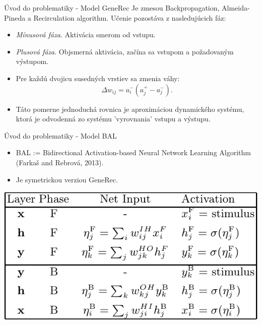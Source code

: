 \documentclass[xcolor=dvipsnames]{beamer}
\begin{document}
\begin{frame}{Úvod do problematiky - Model GeneRec}
Je zmesou Backpropagation, Almeida-Pineda a Recirculation algorithm. Učenie pozostáva z nasledujúcich fáz: 
  \begin{itemize}
    \item \emph{Mínusová fáza}. Aktivácia smerom od vstupu. 
    \item \emph{Plusová fáza}. Objsmerná aktivácia, začína sa vstupom a požadovaným výstupom. 
    \item Pre každú dvojicu susedných vrstiev sa zmenia váhy: 
    $$\Delta w_{ij} = a_i^{-}(a_j^{+} - a_j^{-}).$$
    \item Táto pomerne jednoduchá rovnica je aproximáciou dynamického systému, ktorá je odvodenná zo systému 'vyrovnania' vstupu a výstupu. 
  \end{itemize}
\end{frame}

\begin{frame}{Úvod do problematiky - Model BAL}
  \begin{itemize}
    \item BAL := Bidirectional Activation-based Neural Network Learning Algorithm (Farkaš and Rebrová, 2013).
    \item Je symetrickou verziou GeneRec.
  \end{itemize}
  
  \begin{center}
    \includegraphics[scale=0.5]{img/bal_table.png}
  \end{center}  
\end{frame}

\end{document}
